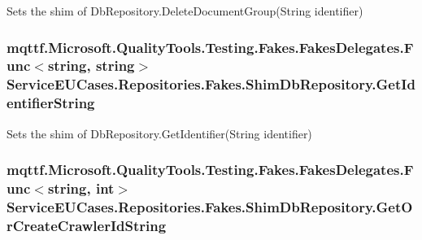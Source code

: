 Sets the shim of Db\-Repository.\-Delete\-Document\-Group(\-String identifier)

\hypertarget{class_service_e_u_cases_1_1_repositories_1_1_fakes_1_1_shim_db_repository_ac1c2c0cc606bee5942e1ed6fd873e3b2}{
\subsubsection[{Get\-Identifier\-String}]{\setlength{\rightskip}{0pt plus 5cm}mqttf.\-Microsoft.\-Quality\-Tools.\-Testing.\-Fakes.\-Fakes\-Delegates.\-Func$<$string, string$>$ Service\-E\-U\-Cases.\-Repositories.\-Fakes.\-Shim\-Db\-Repository.\-Get\-Identifier\-String\hspace{0.3cm}{\ttfamily [set]}}}\label{class_service_e_u_cases_1_1_repositories_1_1_fakes_1_1_shim_db_repository_ac1c2c0cc606bee5942e1ed6fd873e3b2}


Sets the shim of Db\-Repository.\-Get\-Identifier(\-String identifier)

\hypertarget{class_service_e_u_cases_1_1_repositories_1_1_fakes_1_1_shim_db_repository_af78f180fe41e0475c02f5806a028c923}{
\subsubsection[{Get\-Or\-Create\-Crawler\-Id\-String}]{\setlength{\rightskip}{0pt plus 5cm}mqttf.\-Microsoft.\-Quality\-Tools.\-Testing.\-Fakes.\-Fakes\-Delegates.\-Func$<$string, int$>$ Service\-E\-U\-Cases.\-Repositories.\-Fakes.\-Shim\-Db\-Repository.\-Get\-Or\-Create\-Crawler\-Id\-String\hspace{0.3cm}{\ttfamily [set]}}}\label{class_service_e_u_cases_1_1_repositories_1_1_fakes_1_1_shim_db_repository_af78f180fe41e0475c02f5806a028c923}


